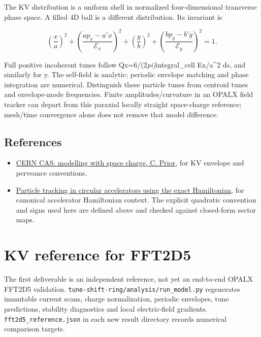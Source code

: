 \documentclass[
  11pt,
  a4paper,
]{article}
\providecommand{\tightlist}{%
  \setlength{\itemsep}{0pt}\setlength{\parskip}{0pt}}
\begin{document}
The KV distribution is a uniform shell in normalized four-dimensional
transverse phase space. A filled 4D ball is a different distribution.
Its invariant is

\[
\left(\frac{x}{a}\right)^2+
\left(\frac{ap_x-a'x}{\mathcal E_x}\right)^2+
\left(\frac{y}{b}\right)^2+
\left(\frac{bp_y-b'y}{\mathcal E_y}\right)^2=1.
\]

Full positive incoherent tunes follow Qx=6/(2\emph{pi)}integral\_cell
Ex/a\^{}2 ds, and similarly for y. The self-field is analytic; periodic
envelope matching and phase integration are numerical. Distinguish these
particle tunes from centroid tunes and envelope-mode frequencies. Finite
amplitudes/curvature in an OPALX field tracker can depart from this
paraxial locally straight space-charge reference; mesh/time convergence
alone does not remove that model difference.

\subsection{References}\label{references}

\begin{itemize}
\tightlist
\item
  \href{https://indico.cern.ch/event/221441/contributions/1524769/attachments/360572/502106/SpaceCharge_Modelling.pdf}{CERN
  CAS: modelling with space charge, C. Prior}, for KV envelope and
  perveance conventions.
\item
  \href{https://s3.cern.ch/inspire-prod-files-7/74c88492a8d6a790563d145198c4813d}{Particle
  tracking in circular accelerators using the exact Hamiltonian}, for
  canonical accelerator Hamiltonian context. The explicit quadratic
  convention and signs used here are defined above and checked against
  closed-form sector maps.
\end{itemize}

\section{KV reference for FFT2D5}\label{kv-reference-for-fft2d5}

The first deliverable is an independent reference, not yet an end-to-end
OPALX FFT2D5 validation. \texttt{tune-shift-ring/analysis/run\_model.py}
regenerates immutable current scans, charge normalization, periodic
envelopes, tune predictions, stability diagnostics and local
electric-field gradients. \texttt{fft2d5\_reference.json} in each new
result directory records numerical comparison targets.
\end{document}
